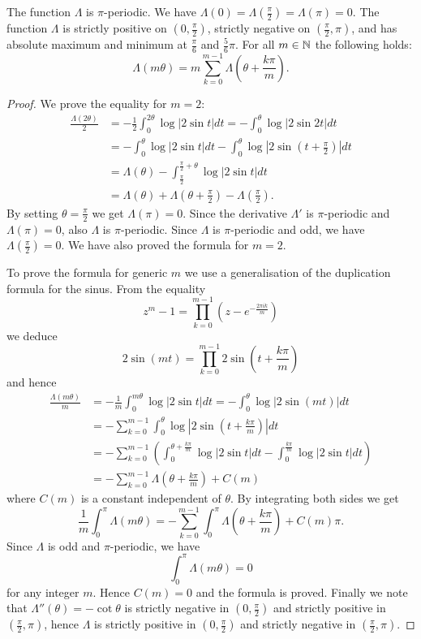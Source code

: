 \begin{prop} \label{Loba:prop}
The function $\Lambda$ is $\pi$-periodic. We have $\Lambda (0) = \Lambda \left(\frac \pi 2 \right) = \Lambda (\pi) = 0$. The function $\Lambda$ is strictly positive on $\left(0,\frac \pi 2 \right)$, strictly negative on $\left(\frac \pi 2, \pi\right)$, and has absolute maximum and minimum at $\frac \pi 6 $ and $\frac 56 \pi$.
For all $m\in \mathbb{N}$ the following holds:
$$\Lambda(m\theta) = m \sum_{k=0}^{m-1} \Lambda\left(\theta + \frac{k\pi}m\right).$$
\end{prop}
\begin{proof}
We prove the equality for $m=2$:
\begin{align*}
\frac{\Lambda(2\theta)}2 & = -\frac 12\int_0^{2\theta} \log |2\sin t|dt = - \int_0^\theta \log |2\sin 2t| dt \\
 & = - \int_0^\theta \log |2\sin t| dt - \int_0^\theta \log \left|2\sin \left(t+\frac \pi 2 \right) \right| dt \\
 & = \Lambda(\theta) - \int_{\frac \pi 2}^{\frac \pi 2 + \theta} \log |2 \sin t| dt \\
  & = \Lambda(\theta) + \Lambda\left(\theta + \frac \pi 2 \right) - \Lambda \left(\frac \pi 2 \right).
\end{align*}
By setting $\theta = \frac \pi 2$ we get $\Lambda(\pi)=0$. Since the derivative $\Lambda'$ is $\pi$-periodic and $\Lambda(\pi)=0$, also $\Lambda$ is $\pi$-periodic. Since $\Lambda$ is $\pi$-periodic and odd, we have $\Lambda \left(\frac \pi 2 \right) = 0$. We have also proved the formula for $m=2$.

To prove the formula for generic $m$ we use a generalisation of the duplication formula for the sinus. From the equality
$$z^m - 1 = \prod_{k=0}^{m-1} \left(z-e^{-\frac {2\pi ik}m}\right)$$
we deduce
$$2\sin(mt) = \prod_{k=0}^{m-1} 2\sin \left(t+\frac{k\pi}m\right)$$
and hence
\begin{align*}
\frac{\Lambda(m\theta)}m & = -\frac 1m \int_0^{m\theta} \log | 2\sin t| dt = - \int_0^\theta \log | 2 \sin (mt)| dt  \\
 & = - \sum_{k=0}^{m-1} \int_0^\theta \log \left|2 \sin \left( t + \frac {k \pi}m \right) \right| dt \\
 & = - \sum_{k=0}^{m-1} \left( \int_0^{\theta + \frac{k\pi}m} \log |2 \sin t| dt - \int_0^{\frac {k\pi}m} \log | 2\sin t | dt \right) \\
 & = - \sum_{k=0}^{m-1} \Lambda \left(\theta + \frac{k\pi}m \right) + C(m)
 \end{align*}
where $C(m)$ is a constant independent of $\theta$. By integrating both sides we get 
$$\frac 1m \int_0^\pi \Lambda(m\theta) = -\sum_{k=0}^{m-1}\int_0^\pi \Lambda\left(\theta + \frac{k\pi}m \right) + C(m)\pi.$$
Since $\Lambda$ is odd and $\pi$-periodic, we have
$$\int_0^\pi \Lambda (m\theta) = 0$$
for any integer $m$. Hence $C(m)=0$ and the formula is proved. Finally we note that $\Lambda''(\theta) = -\cot \theta $ is strictly negative in $(0,\frac \pi 2)$ and strictly positive in $(\frac \pi 2, \pi)$, hence $\Lambda$ is strictly positive in $(0, \frac \pi 2)$ and strictly negative in $(\frac \pi 2, \pi)$.
\end{proof}

